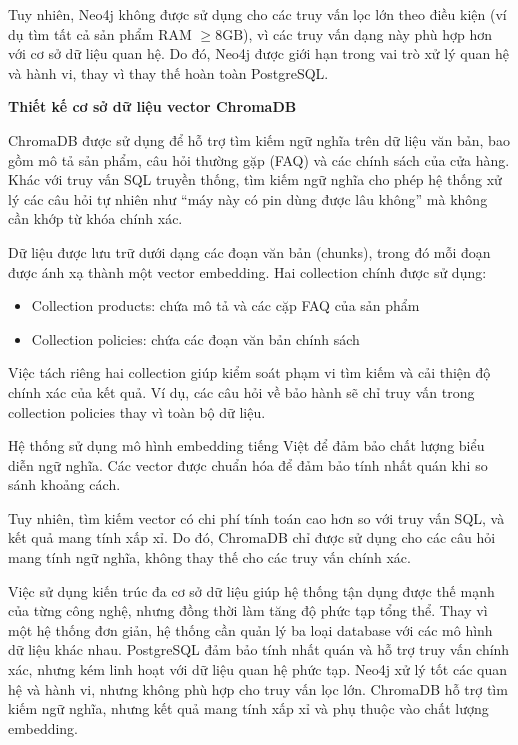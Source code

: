 Tuy nhiên, Neo4j không được sử dụng cho các truy vấn lọc lớn theo điều kiện (ví dụ tìm tất cả sản phẩm RAM $\geq 8\text{GB}$), vì các truy vấn dạng này phù hợp hơn với cơ sở dữ liệu quan hệ. Do đó, Neo4j được giới hạn trong vai trò xử lý quan hệ và hành vi, thay vì thay thế hoàn toàn PostgreSQL.



\textbf{Thiết kế cơ sở dữ liệu vector ChromaDB}

ChromaDB được sử dụng để hỗ trợ tìm kiếm ngữ nghĩa trên dữ liệu văn bản, bao gồm mô tả sản phẩm, câu hỏi thường gặp (FAQ) và các chính sách của cửa hàng. Khác với truy vấn SQL truyền thống, tìm kiếm ngữ nghĩa cho phép hệ thống xử lý các câu hỏi tự nhiên như ``máy này có pin dùng được lâu không'' mà không cần khớp từ khóa chính xác.

Dữ liệu được lưu trữ dưới dạng các đoạn văn bản (chunks), trong đó mỗi đoạn được ánh xạ thành một vector embedding. Hai collection chính được sử dụng:

\begin{itemize}
\item Collection products: chứa mô tả và các cặp FAQ của sản phẩm
\item Collection policies: chứa các đoạn văn bản chính sách
\end{itemize}

Việc tách riêng hai collection giúp kiểm soát phạm vi tìm kiếm và cải thiện độ chính xác của kết quả. Ví dụ, các câu hỏi về bảo hành sẽ chỉ truy vấn trong collection policies thay vì toàn bộ dữ liệu.

Hệ thống sử dụng mô hình embedding tiếng Việt để đảm bảo chất lượng biểu diễn ngữ nghĩa. Các vector được chuẩn hóa để đảm bảo tính nhất quán khi so sánh khoảng cách.

Tuy nhiên, tìm kiếm vector có chi phí tính toán cao hơn so với truy vấn SQL, và kết quả mang tính xấp xỉ. Do đó, ChromaDB chỉ được sử dụng cho các câu hỏi mang tính ngữ nghĩa, không thay thế cho các truy vấn chính xác.

Việc sử dụng kiến trúc đa cơ sở dữ liệu giúp hệ thống tận dụng được thế mạnh của từng công nghệ, nhưng đồng thời làm tăng độ phức tạp tổng thể. Thay vì một hệ thống đơn giản, hệ thống cần quản lý ba loại database với các mô hình dữ liệu khác nhau. PostgreSQL đảm bảo tính nhất quán và hỗ trợ truy vấn chính xác, nhưng kém linh hoạt với dữ liệu quan hệ phức tạp. Neo4j xử lý tốt các quan hệ và hành vi, nhưng không phù hợp cho truy vấn lọc lớn. ChromaDB hỗ trợ tìm kiếm ngữ nghĩa, nhưng kết quả mang tính xấp xỉ và phụ thuộc vào chất lượng embedding.










